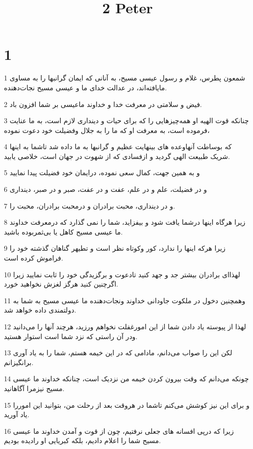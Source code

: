 

\title{2 Peter}


\chapter{1}

\par 1 شمعون پطرس، غلام و رسول عیسی مسیح، به آنانی که ایمان گرانبها را به مساوی مایافته‌اند، در عدالت خدای ما و عیسی مسیح نجات‌دهنده.
\par 2 فیض و سلامتی در معرفت خدا و خداوند ماعیسی بر شما افزون باد.
\par 3 چنانکه قوت الهیه او همه‌چیزهایی را که برای حیات و دینداری لازم است، به ما عنایت فرموده است، به معرفت او که ما را به جلال وفضیلت خود دعوت نموده،
\par 4 که بوساطت آنهاوعده های بینهایت عظیم و گرانبها به ما داده شد تاشما به اینها شریک طبیعت الهی گردید و ازفسادی که از شهوت در جهان است، خلاصی یابید.
\par 5 و به همین جهت، کمال سعی نموده، درایمان خود فضیلت پیدا نمایید
\par 6 و در فضیلت، علم و در علم، عفت و در عفت، صبر و در صبر، دینداری
\par 7 و در دینداری، محبت برادران و درمحبت برادران، محبت را.
\par 8 زیرا هرگاه اینها درشما یافت شود و بیفزاید، شما را نمی گذارد که درمعرفت خداوند ما عیسی مسیح کاهل یا بی‌ثمربوده باشید.
\par 9 زیرا هرکه اینها را ندارد، کور وکوتاه نظر است و تطیهر گناهان گذشته خود را فراموش کرده است.
\par 10 لهذا‌ای برادران بیشتر جد و جهد کنید تادعوت و برگزیدگی خود را ثابت نمایید زیرا اگرچنین کنید هرگز لغزش نخواهید خورد.
\par 11 وهمچنین دخول در ملکوت جاودانی خداوند ونجات‌دهنده ما عیسی مسیح به شما به دولتمندی داده خواهد شد.
\par 12 لهذا از پیوسته یاد دادن شما از این امورغفلت نخواهم ورزید، هرچند آنها را می‌دانید ودر آن راستی که نزد شما است استوار هستید.
\par 13 لکن این را صواب می‌دانم، مادامی که در این خیمه هستم، شما را به یاد آوری برانگیزانم.
\par 14 چونکه می‌دانم که وقت بیرون کردن خیمه من نزدیک است، چنانکه خداوند ما عیسی مسیح نیزمرا آگاهانید.
\par 15 و برای این نیز کوشش می‌کنم تاشما در هروقت بعد از رحلت من، بتوانید این اموررا یاد آورید.
\par 16 زیرا که در‌پی افسانه های جعلی نرفتیم، چون از قوت و آمدن خداوند ما عیسی مسیح شما را اعلام دادیم، بلکه کبریایی او رادیده بودیم.
